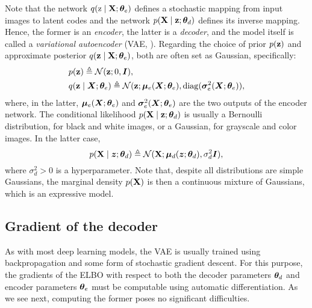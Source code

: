 Note that the network $q({\textnormal{z}} \mid {\mathbf{X}}; {\bm{\theta}}_e)$ defines a stochastic mapping from input images to latent codes and the network $p({\mathbf{X}} \mid {\mathbf{z}}; {\bm{\theta}}_d)$ defines its inverse mapping. Hence, the former is an \emph{encoder}, the latter is a \emph{decoder}, and the model itself is called a \emph{variational autoencoder} (VAE, \citet{Kingma2013}). Regarding the choice of prior $p({\mathbf{z}})$ and approximate posterior $q({\mathbf{z}} \mid {\mathbf{X}}; {\bm{\theta}}_e)$, both are often set as Gaussian, specifically:
\begin{align}
    &p({\mathbf{z}}) \triangleq \mathcal{N}({\mathbf{z}}; 0, {\bm{I}}), \\
    &q({\mathbf{z}} \mid {\bm{X}}; {\bm{\theta}}_e) \triangleq \mathcal{N}({\mathbf{z}}; {\bm{\mu}}_e({\bm{X}}; {\bm{\theta}}_e), \mathrm{diag}({\bm{\sigma}}_e^2({\bm{X}}; {\bm{\theta}}_e)),
\end{align}
where, in the latter, ${\bm{\mu}}_e({\bm{X}}; {\bm{\theta}}_e)$ and ${\bm{\sigma}}_e^2({\bm{X}}; {\bm{\theta}}_e)$ are the two outputs of the encoder network. The conditional likelihood $p({\mathbf{X}} \mid {\mathbf{z}}; {\bm{\theta}}_d)$ is usually a Bernoulli distribution, for black and white images, or a Gaussian, for grayscale and color images. In the latter case,
\begin{equation}
    \label{eq:gaussian_vae}
    p({\mathbf{X}} \mid {\bm{z}}; {\bm{\theta}}_d) \triangleq \mathcal{N}({\mathbf{X}}; {\bm{\mu}}_d({\bm{z}}; {\bm{\theta}}_d), \sigma_d^2 {\bm{I}}),
\end{equation}
where $\sigma_d^2 > 0$ is a hyperparameter. Note that, despite all distributions are simple Gaussians, the marginal density $p({\mathbf{X}})$ is then a continuous mixture of Gaussians, which is an expressive model.

\subsection{Gradient of the decoder}
\label{sec:vae_decoder_grad}
As with most deep learning models, the VAE is usually trained using backpropagation and some form of stochastic gradient descent. For this purpose, the gradients of the ELBO with respect to both the decoder parameters ${\bm{\theta}}_d$ and encoder parameters ${\bm{\theta}}_e$ must be computable using automatic differentiation. As we see next, computing the former poses no significant difficulties.


